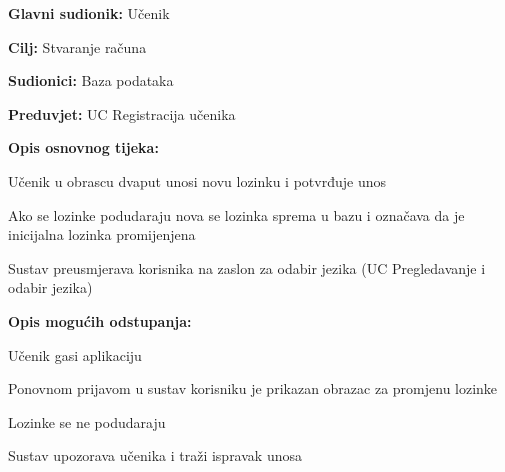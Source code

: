 					\noindent {}
					\begin{packed_item}
	
						\item \textbf{Glavni sudionik:} Učenik
						\item  \textbf{Cilj:} Stvaranje računa
						\item  \textbf{Sudionici:} Baza podataka
						\item  \textbf{Preduvjet:} UC Registracija učenika
						\item  \textbf{Opis osnovnog tijeka:}
						
						\item[] \begin{packed_enum}
	
							\item Učenik u obrascu dvaput unosi novu lozinku i potvrđuje unos
							\item Ako se lozinke podudaraju nova se lozinka sprema u bazu i označava da
							je inicijalna lozinka promijenjena
							\item Sustav preusmjerava korisnika na zaslon za odabir jezika (UC Pregledavanje i odabir jezika)
						\end{packed_enum}
						
						\item  \textbf{Opis mogućih odstupanja:}
						
						\item[] \begin{packed_item}
	
							\item[1.a]Učenik gasi aplikaciju
							\item[] \begin{packed_enum}
								
								\item Ponovnom prijavom u sustav korisniku je prikazan obrazac za promjenu lozinke						
							\end{packed_enum}

							\item[2.a] Lozinke se ne podudaraju
							\item[] \begin{packed_enum}
								
								\item Sustav upozorava učenika i traži ispravak unosa  								
							\end{packed_enum}
							
						\end{packed_item}
					\end{packed_item}
				
